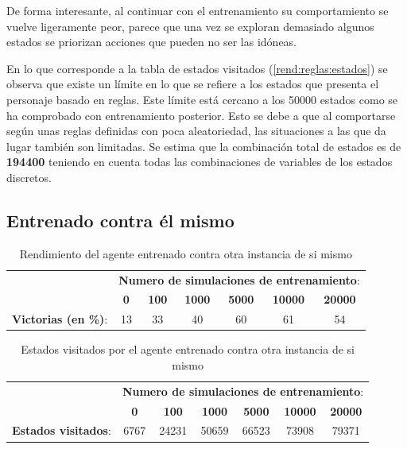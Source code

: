 \bigskip

De forma interesante, al continuar con el entrenamiento su comportamiento se vuelve ligeramente peor, parece que una vez se exploran demasiado algunos estados se priorizan acciones que pueden no ser las idóneas.

\bigskip

En lo que corresponde a la tabla de estados visitados (\ref{rend:reglas:estados}) se observa que existe un límite en lo que se refiere a los estados que presenta el personaje basado en reglas. Este límite está cercano a los 50000 estados como se ha comprobado con entrenamiento posterior. Esto se debe a que al comportarse según unas reglas definidas con poca aleatoriedad, las situaciones a las que da lugar también son limitadas. Se estima que la combinación total de estados es de \textbf{194400} teniendo en cuenta todas las combinaciones de variables de los estados discretos.

\subsection{Entrenado contra él mismo}
\label{agente2}
\label{cap:pruebas:mismo}

\begin{table}
	\begin{center}
		\begin{tabular}{c|c|c|c|c|c|c|}
			& \multicolumn{6}{c|}{\textbf{Numero de simulaciones de entrenamiento}:}\\
			\cline{2-7} & \textbf{0} & \textbf{100} & \textbf{1000} & \textbf{5000} & \textbf{10000} & \textbf{20000}\\
			
			\hline
			\textbf{Victorias (en \%)}: &  13 & 33 & 40 & 60 & 61 & 54\\
			
			\hline
		\end{tabular}
		\caption{Rendimiento del agente entrenado contra otra instancia de si mismo}
		\label{rend:el:victorias}
	\end{center}
\end{table}

\begin{table}
	\begin{center}
		\begin{tabular}{c|c|c|c|c|c|c|}
			& \multicolumn{6}{c|}{\textbf{Numero de simulaciones de entrenamiento}:}\\
			\cline{2-7} & \textbf{0} & \textbf{100} & \textbf{1000} & \textbf{5000} & \textbf{10000} & \textbf{20000}\\
			
			\hline
			\textbf{Estados visitados}: &  6767 & 24231 & 50659 & 66523 & 73908 & 79371 \\
			
			\hline
		\end{tabular}
		\caption{Estados visitados por el agente entrenado contra otra instancia de si mismo}
		\label{rend:el:estados}
	\end{center}
\end{table}

